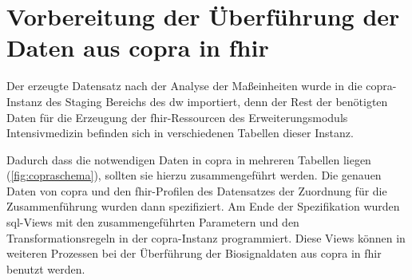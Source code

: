\section[Vorbereitung der Überführung der Daten aus \acs{copra} in \acs{fhir}]{ Vorbereitung der Überführung der Daten aus \acs{copra} in \acs{fhir}} \label{sec:docutransfer}

Der erzeugte Datensatz nach der Analyse der Maßeinheiten wurde in die \ac{copra}-Instanz des Staging Bereichs des \ac{dw} importiert, denn der Rest der benötigten Daten für die Erzeugung der \ac{fhir}-Ressourcen des Erweiterungsmoduls \glqq Intensivmedizin\grqq{} befinden sich in verschiedenen Tabellen dieser Instanz. 

Dadurch dass die notwendigen Daten in \ac{copra} in mehreren Tabellen liegen (\ref{fig:copraschema}), sollten sie hierzu zusammengeführt werden. Die genauen Daten von \ac{copra} und den \ac{fhir}-Profilen des Datensatzes der Zuordnung für die Zusammenführung wurden dann spezifiziert.
Am Ende der Spezifikation wurden \ac{sql}-Views mit den zusammengeführten Parametern und den Transformationsregeln in der \ac{copra}-Instanz programmiert. Diese Views können in weiteren Prozessen bei der Überführung der Biosignaldaten aus \ac{copra} in \ac{fhir} benutzt werden.